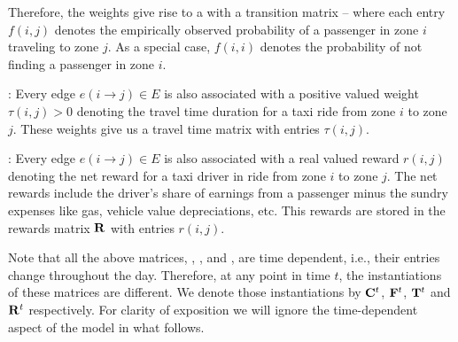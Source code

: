 Therefore, the weights give rise to a {\markovchain} with a transition matrix {\empiricaltransitionmatrix} -- 
where each entry $f(i,j)$ 
denotes the empirically observed probability of a passenger in zone $i$
traveling to zone $j$. 
As a special case, 
$f(i,i)$ denotes the probability of not finding a passenger in zone $i$. 


:
Every edge $e(i\rightarrow j) \in E$ is also associated with a positive valued weight $\tau(i,j) > 0$ 
denoting the travel time duration for a taxi ride from zone $i$ to zone $j$. 
These weights give us a travel time matrix {\traveltimematrix} with entries $\tau(i,j)$. 


:
Every edge $e(i \rightarrow j) \in E$ is also associated with a real valued reward $r(i,j)$ denoting
the net reward for a taxi driver in ride from zone $i$ to zone $j$. The net rewards include the driver's
share of earnings from a passenger minus the sundry expenses like gas, vehicle value depreciations, etc. This rewards are stored in the rewards matrix ${\mathbf{R}}$
with entries $r(i,j)$.

Note that all the above matrices, {\countmatrix}, {\empiricaltransitionmatrix}, {\traveltimematrix} and {\rewardsmatrix}, are time dependent, i.e., their entries change throughout the day. Therefore, at any point in time $t$, the instantiations of these matrices
are different. We denote those instantiations by ${\mathbf{C}}^t$, ${\mathbf{F}}^t$, ${\mathbf{T}}^t$ and ${\mathbf{R}}^t$ respectively.
For clarity of exposition we will ignore the time-dependent aspect of the model in what follows.


